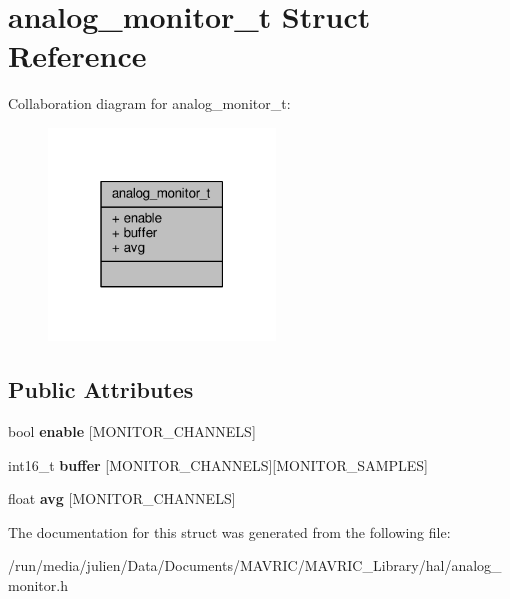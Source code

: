 \hypertarget{structanalog__monitor__t}{\section{analog\+\_\+monitor\+\_\+t Struct Reference}
\label{structanalog__monitor__t}
}


Collaboration diagram for analog\+\_\+monitor\+\_\+t\+:
\nopagebreak
\begin{figure}[H]
\begin{center}
\leavevmode
\includegraphics[width=171pt]{structanalog__monitor__t__coll__graph}
\end{center}
\end{figure}
\subsection*{Public Attributes}
\begin{DoxyCompactItemize}
\item 
\hypertarget{structanalog__monitor__t_acb2b73fae9665a9df79dc81fe13bfa32}{bool {\bfseries enable} \mbox{[}M\+O\+N\+I\+T\+O\+R\+\_\+\+C\+H\+A\+N\+N\+E\+L\+S\mbox{]}}\label{structanalog__monitor__t_acb2b73fae9665a9df79dc81fe13bfa32}

\item 
\hypertarget{structanalog__monitor__t_a35f8538aac910387a48b3d90d2e7d91a}{int16\+\_\+t {\bfseries buffer} \mbox{[}M\+O\+N\+I\+T\+O\+R\+\_\+\+C\+H\+A\+N\+N\+E\+L\+S\mbox{]}\mbox{[}M\+O\+N\+I\+T\+O\+R\+\_\+\+S\+A\+M\+P\+L\+E\+S\mbox{]}}\label{structanalog__monitor__t_a35f8538aac910387a48b3d90d2e7d91a}

\item 
\hypertarget{structanalog__monitor__t_aeb67bca5fc1ae72836caf06f1b257682}{float {\bfseries avg} \mbox{[}M\+O\+N\+I\+T\+O\+R\+\_\+\+C\+H\+A\+N\+N\+E\+L\+S\mbox{]}}\label{structanalog__monitor__t_aeb67bca5fc1ae72836caf06f1b257682}

\end{DoxyCompactItemize}


The documentation for this struct was generated from the following file\+:\begin{DoxyCompactItemize}
\item 
/run/media/julien/\+Data/\+Documents/\+M\+A\+V\+R\+I\+C/\+M\+A\+V\+R\+I\+C\+\_\+\+Library/hal/analog\+\_\+monitor.\+h\end{DoxyCompactItemize}
